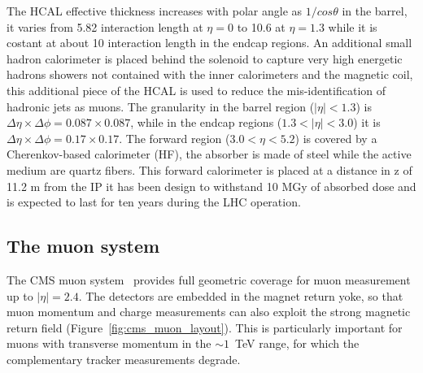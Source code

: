 The HCAL effective thickness increases with polar angle as $1/cos\theta$ in the barrel, 
it varies from 5.82 interaction length at $\eta = 0$ to 10.6 at $\eta = 1.3$ while it is
costant at about 10 interaction length in the endcap regions.
An additional  small hadron
calorimeter is placed behind the solenoid to capture very high energetic hadrons showers not
contained with the inner calorimeters and the magnetic coil, this additional piece of the HCAL
is used to reduce the mis-identification of hadronic jets as muons. The
granularity in the barrel region ($|\eta|<1.3$) is $\Delta\eta × \Delta\phi = 0.087 \times 0.087$, while
in the endcap regions ($1.3<|\eta|<3.0$) it is
$\Delta\eta × \Delta\phi = 0.17 \times 0.17$. The forward region ($3.0 < \eta < 5.2$)
is covered by a Cherenkov-based calorimeter (HF), the absorber is made of steel while the
active medium are quartz fibers.
This forward calorimeter is placed at a distance in z of 11.2 m from the IP it has been design
to withstand 10 MGy of absorbed dose and is expected to last for ten years during the LHC operation.

\subsection{The muon system}
The CMS muon system~\cite{muon_tp} provides full geometric coverage for muon measurement up to $|\eta| = 2.4$.
The detectors are embedded in the magnet return yoke, so that muon momentum and charge
measurements can also exploit the strong magnetic return field (Figure~\ref{fig:cms_muon_layout}).
This is particularly important
for muons with transverse momentum in the $\sim 1$~TeV range, for which the complementary tracker
measurements degrade.

